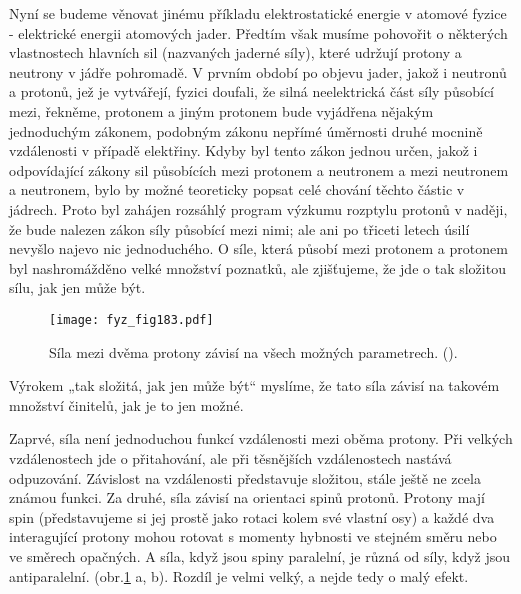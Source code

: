     Nyní se budeme věnovat jinému příkladu elektrostatické energie v atomové fyzice - elektrické
    energii atomových jader. Předtím však musíme pohovořit o některých vlastnostech hlavních sil
    (nazvaných jaderné síly), které udržují protony a neutrony v jádře pohromadě. V prvním období po
    objevu jader, jakož i neutronů a protonů, jež je vytvářejí, fyzici doufali, že silná
    neelektrická část síly působící mezi, řekněme, protonem a jiným protonem bude vyjádřena nějakým
    jednoduchým zákonem, podobným zákonu nepřímé úměrnosti druhé mocnině vzdálenosti v případě
    elektřiny. Kdyby byl tento zákon jednou určen, jakož i odpovídající zákony sil působících mezi
    protonem a neutronem a mezi neutronem a neutronem, bylo by možné teoreticky popsat celé chování
    těchto částic v jádrech. Proto byl zahájen rozsáhlý program výzkumu rozptylu protonů v naději,
    že bude nalezen zákon síly působící mezi nimi; ale ani po třiceti letech úsilí nevyšlo najevo
    nic jednoduchého. O síle, která působí mezi protonem a protonem byl nashromážděno velké množství
    poznatků, ale zjišťujeme, že jde o tak složitou sílu, jak jen může být.

    \begin{figure}[ht!]  %
      \centering
      \texttt{[image: fyz\_fig183.pdf]}
      \caption{Síla mezi dvěma protony závisí na všech možných parametrech.
              (\cite[s.~148]{Feynman02}).}
      \label{fyz:fig183}
    \end{figure}

    Výrokem „tak složitá, jak jen může být“ myslíme, že tato síla závisí na takovém množství
    činitelů, jak je to jen možné.
    
    Zaprvé, síla není jednoduchou funkcí vzdálenosti mezi oběma protony. Při velkých vzdálenostech
    jde o přitahování, ale při těsnějších vzdálenostech nastává odpuzování. Závislost na vzdálenosti
    představuje složitou, stále ještě ne zcela známou funkci. Za druhé, síla závisí na orientaci
    spinů protonů. Protony mají spin (představujeme si jej prostě jako rotaci kolem své vlastní osy)
    a každé dva interagující protony mohou rotovat s momenty hybnosti ve stejném směru nebo ve
    směrech opačných. A síla, když jsou spiny paralelní, je různá od síly, když jsou antiparalelní.
    (obr.\ref{fyz:fig183} a, b). Rozdíl je velmi velký, a nejde tedy o malý efekt.

